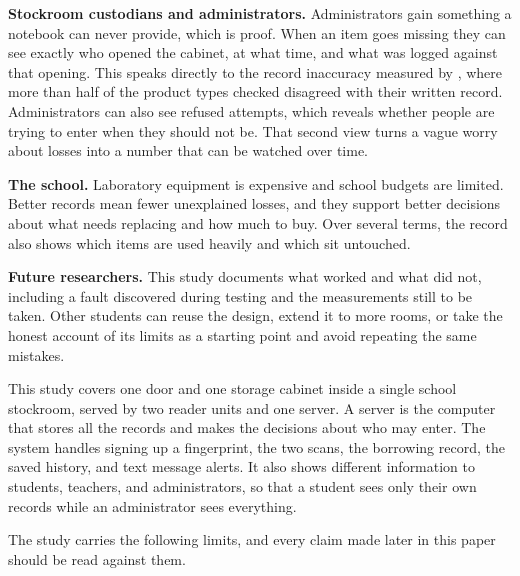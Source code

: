 \textbf{Stockroom custodians and administrators.} Administrators gain something
a notebook can never provide, which is proof. When an item goes missing they can
see exactly who opened the cabinet, at what time, and what was logged against
that opening. This speaks directly to the record inaccuracy measured by
\textcite{linuwih2025}, where more than half of the product types checked
disagreed with their written record. Administrators can also see refused
attempts, which reveals whether people are trying to enter when they should not
be. That second view turns a vague worry about losses into a number that can be
watched over time.

\textbf{The school.} Laboratory equipment is expensive and school budgets are
limited. Better records mean fewer unexplained losses, and they support better
decisions about what needs replacing and how much to buy. Over several terms,
the record also shows which items are used heavily and which sit untouched.

\textbf{Future researchers.} This study documents what worked and what did not,
including a fault discovered during testing and the measurements still to be
taken. Other students can reuse the design, extend it to more rooms, or take the
honest account of its limits as a starting point and avoid repeating the same
mistakes.


This study covers one door and one storage cabinet inside a single school
stockroom, served by two reader units and one server. A server is the computer
that stores all the records and makes the decisions about who may enter. The
system handles signing up a fingerprint, the two scans, the borrowing record,
the saved history, and text message alerts. It also shows different information
to students, teachers, and administrators, so that a student sees only their own
records while an administrator sees everything.

The study carries the following limits, and every claim made later in this paper
should be read against them.

